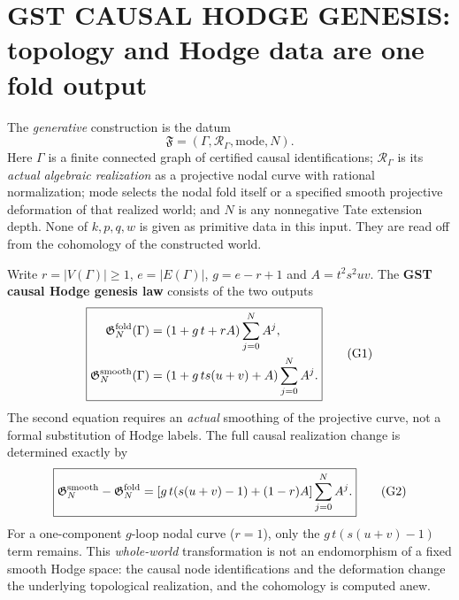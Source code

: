 \documentclass[11pt]{article}
\begin{document}
\section{GST CAUSAL HODGE GENESIS: topology and Hodge data are one fold output}
The \emph{generative} construction is the datum
\[
\mathfrak F=(\Gamma,\mathcal R_\Gamma,\mathrm{mode},N).
\]
Here $\Gamma$ is a finite connected graph of certified causal
identifications; $\mathcal R_\Gamma$ is its \emph{actual algebraic
realization} as a projective nodal curve with rational normalization;
$\mathrm{mode}$ selects the nodal fold itself or a specified smooth
projective deformation of that realized world; and $N$ is any
nonnegative Tate extension depth. None of $k,p,q,w$ is given as
primitive data in this input. They are read off from the cohomology
of the constructed world.

Write $r=|V(\Gamma)|\ge1$, $e=|E(\Gamma)|$,
$g=e-r+1$ and $A=t^2s^2uv$.
The \textbf{GST causal Hodge genesis law} consists of the two outputs
\[
\boxed{\begin{aligned}
\mathfrak G_N^{\rm fold}(\Gamma)&=
 (1+g\,t+rA)\sum_{j=0}^N A^j,\\
\mathfrak G_N^{\rm smooth}(\Gamma)&=
 (1+g\,ts(u+v)+A)\sum_{j=0}^N A^j.
\end{aligned}} \tag{G1}
\]
The second equation requires an \emph{actual} smoothing of the
projective curve, not a formal substitution of Hodge labels.
The full causal realization change is determined exactly by
\[
\boxed{
\mathfrak G_N^{\rm smooth}-\mathfrak G_N^{\rm fold}
  =[g\,t(s(u+v)-1)+(1-r)A]\sum_{j=0}^N A^j.
} \tag{G2}
\]
For a one-component $g$-loop nodal curve ($r=1$), only the
$g\,t(s(u+v)-1)$ term remains. This \emph{whole-world}
transformation is not an endomorphism of a fixed smooth Hodge
space: the causal node identifications and the deformation
change the underlying topological realization, and the cohomology
is computed anew.
\end{document}
